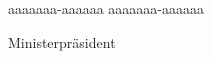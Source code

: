 \documentclass{book}
\begin{document}
    aaaaaaa-aaaaaa aaaaaaa-aaaaaa
   \tagmcend
  \tagstructend

    Ministerpräsident
   \tagmcend
  \tagstructend
\tagstructend
\end{document}
